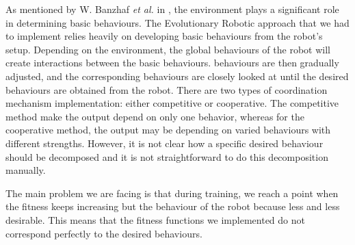 \documentclass[lettersize,journal]{IEEEtran}
\begin{document}
As mentioned by W. Banzhaf \emph{et al.} in \cite{ref1}, the environment plays a significant role in determining basic behaviours. The Evolutionary Robotic approach that we had to implement relies heavily on developing basic behaviours from the robot's setup. Depending on the environment, the global behaviours of the robot will create interactions between the basic behaviours. behaviours are then gradually adjusted, and the corresponding behaviours are closely looked at until the desired behaviours are obtained from the robot. There are two types of coordination mechanism implementation: either competitive or cooperative. The competitive method make the output depend on only one behavior, whereas for the cooperative method, the output may be depending on varied behaviours with different strengths. However, it is not clear how a specific desired behaviour should be decomposed and it is not straightforward to do this decomposition manually.
\par
The main problem we are facing is that during training, we reach a point when the fitness keeps increasing but the behaviour of the robot because less and less desirable. This means that the fitness functions we implemented do not correspond perfectly to the desired behaviours.
\end{document}
